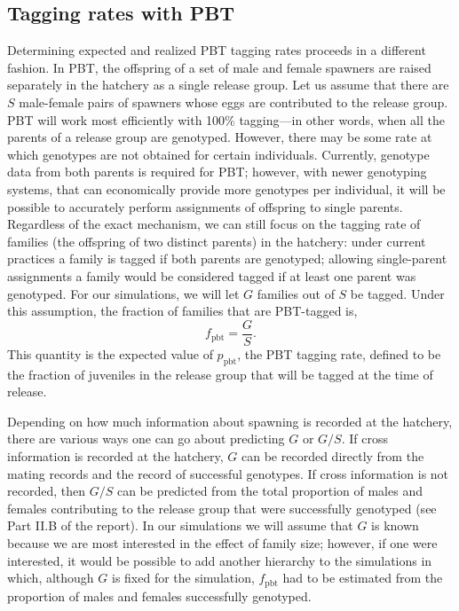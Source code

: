\documentclass[11pt]{article}
\begin{document}
\subsection{Tagging rates with PBT}
Determining expected and realized PBT tagging rates proceeds in a different fashion.  In PBT, the
offspring of a set of male and female spawners are raised separately in the hatchery
as a single release group. Let us assume that there are $S$ male-female pairs of spawners
whose eggs are contributed to the release group.  PBT will work most
efficiently with 100\% tagging---in other words, when all the parents of a release group
are genotyped.  However, there may be some rate at which genotypes are not obtained for certain
individuals.  Currently,
genotype data from both parents is  required for PBT; however, with newer genotyping
systems, that can economically provide more genotypes per individual, it will be possible
to accurately perform assignments of offspring to single parents.  Regardless of the exact mechanism,
we can still focus on the tagging rate of families (the offspring of two distinct parents) in the hatchery: under current practices
a family is tagged if both parents are genotyped; allowing single-parent assignments a family would be
considered tagged if at least one parent was genotyped.  For our 
simulations, we will let $G$ families out of $S$ be tagged.
Under this assumption, the
fraction of families that are PBT-tagged is,
\[
f_\mathrm{pbt} = \frac{G}{S}.
\]   
This quantity is the expected value of $p_\mathrm{pbt}$, the PBT tagging rate, defined to be the
fraction of juveniles in the release group that will be tagged at the time
of release.

 
  
Depending on how much information about spawning is recorded at the hatchery, there are various
ways one can go about predicting $G$ or $G/S$. 
If cross information is recorded at the
hatchery, $G$ can be recorded directly from the mating records and the record of successful genotypes.
If cross information is not recorded, then $G/S$ can be predicted from the total proportion of males and 
females contributing to the release group that were successfully genotyped (see Part II.B of the report).
In our simulations we will assume that $G$ is known because we are most interested in the effect of family
size;  however, if one were interested, it would be possible to add another hierarchy to the simulations in which,
although $G$ is fixed for the simulation,  $f_\mathrm{pbt}$ had to be estimated from the proportion of males
and females successfully genotyped.
\end{document}
